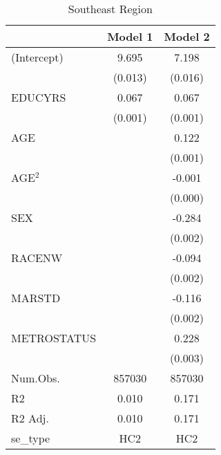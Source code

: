 \documentclass[12pt, English]{article}
\begin{document}
\begin{table}
\centering %
    \caption{Southeast Region}
    \vspace{7.5mm} %
\begin{tabular}[t]{lcc}
\toprule
 & Model 1 & Model 2\\
\midrule
(Intercept) & 9.695 & 7.198\\
 & (0.013) & (0.016)\\
EDUCYRS & 0.067 & 0.067\\
 & (0.001) & (0.001)\\
AGE &  & 0.122\\
 &  & (0.001)\\
AGE$^2$ &  & -0.001\\
 &  & (0.000)\\
SEX &  & -0.284\\
 &  & \vphantom{2} (0.002)\\
RACENW &  & -0.094\\
 &  & \vphantom{1} (0.002)\\
MARSTD &  & -0.116\\
 &  & (0.002)\\
METROSTATUS &  & 0.228\\
 &  & (0.003)\\
\midrule
Num.Obs. & 857030 & 857030\\
R2 & 0.010 & 0.171\\
R2 Adj. & 0.010 & 0.171\\
se\_type & HC2 & HC2\\
\bottomrule
\end{tabular}
\end{table}


\newpage
\end{document}
